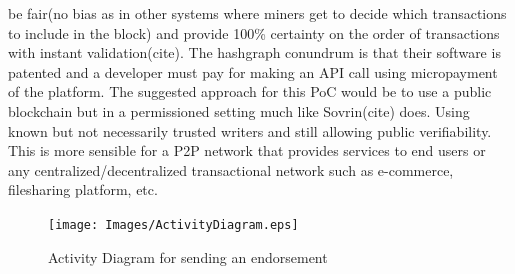 be fair(no bias as in other systems where miners get to decide which
transactions to include in the block) and provide 100\% certainty on the order
of transactions with instant validation(cite). The hashgraph conundrum is that
their software is patented and a developer must pay for making an API call
using micropayment of the platform. The suggested approach for this PoC would
be to use a public blockchain but in a permissioned setting much like
Sovrin(cite) does. Using known but not necessarily trusted writers and still
allowing public verifiability. This is more sensible for a P2P network that
provides services to end users or any centralized/decentralized transactional
network such as e-commerce, filesharing platform, etc. 



\begin{figure}
	\centering
	\texttt{[image: Images/ActivityDiagram.eps]}
	\caption{Activity Diagram for sending an endorsement}
	\label{fig:activity}
\end{figure}







 
 



